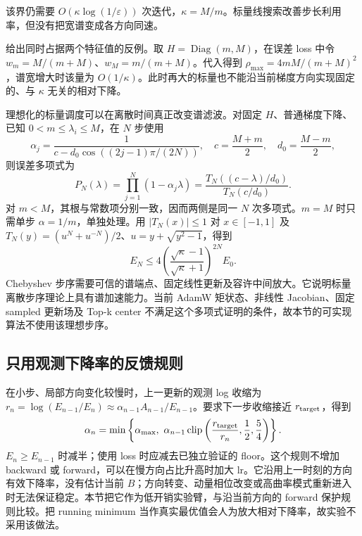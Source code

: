 该界仍需要 $O(\kappa\log(1/\varepsilon))$ 次迭代，$\kappa=M/m$。标量线搜索改善步长利用率，但没有把宽谱变成各方向同速。

给出同时占据两个特征值的反例。取 $H=\operatorname{Diag}(m,M)$，在误差 loss 中令 $w_m=M/(m+M)$、$w_M=m/(m+M)$。代入得到 $\rho_{\max}=4mM/(m+M)^2$，谱宽增大时该量为 $O(1/\kappa)$。此时再大的标量也不能沿当前梯度方向实现固定的、与 $\kappa$ 无关的相对下降。

理想化的标量调度可以在离散时间真正改变谱滤波。对固定 $H$、普通梯度下降、已知 $0<m\le\lambda_i\le M$，在 $N$ 步使用
\begin{equation}
\alpha_j=\frac{1}{c-d_0\cos((2j-1)\pi/(2N))},\quad
c=\frac{M+m}{2},\quad d_0=\frac{M-m}{2},
\end{equation}
则误差多项式为
\begin{equation}
P_N(\lambda)=\prod_{j=1}^N(1-\alpha_j\lambda)
=\frac{T_N((c-\lambda)/d_0)}{T_N(c/d_0)}.
\end{equation}
对 $m<M$，其根与常数项分别一致，因而两侧是同一 $N$ 次多项式。$m=M$ 时只需单步 $\alpha=1/m$，单独处理。用 $|T_N(x)|\le1$ 对 $x\in[-1,1]$ 及 $T_N(y)=(u^N+u^{-N})/2$、$u=y+\sqrt{y^2-1}$，得到
\begin{equation}
E_N\le4\left(\frac{\sqrt\kappa-1}{\sqrt\kappa+1}\right)^{2N}E_0.
\end{equation}
Chebyshev 步序需要可信的谱端点、固定线性更新及容许中间放大。它说明标量离散步序理论上具有谱加速能力。当前 AdamW 矩状态、非线性 Jacobian、固定 sampled 更新场及 Top-k center 不满足这个多项式证明的条件，故本节的可实现算法不使用该理想步序。

\subsection{只用观测下降率的反馈规则}

在小步、局部方向变化较慢时，上一更新的观测 log 收缩为 $r_n=\log(E_{n-1}/E_n)\approx\alpha_{n-1}A_{n-1}/E_{n-1}$。要求下一步收缩接近 $r_{\rm target}$，得到
\begin{equation}
\alpha_n=\min\left\{\alpha_{\max},\ \alpha_{n-1}\operatorname{clip}\left(\frac{r_{\rm target}}{r_n},\frac12,\frac54\right)\right\}.
\end{equation}
$E_n\ge E_{n-1}$ 时减半；使用 loss 时应减去已独立验证的 floor。这个规则不增加 backward 或 forward，可以在慢方向占比升高时加大 lr。它沿用上一时刻的方向有效下降率，没有估计当前 $B$；方向转变、动量相位改变或高曲率模式重新进入时无法保证稳定。本节把它作为低开销实验臂，与沿当前方向的 forward 保护规则比较。把 running minimum 当作真实最优值会人为放大相对下降率，故实验不采用该做法。

